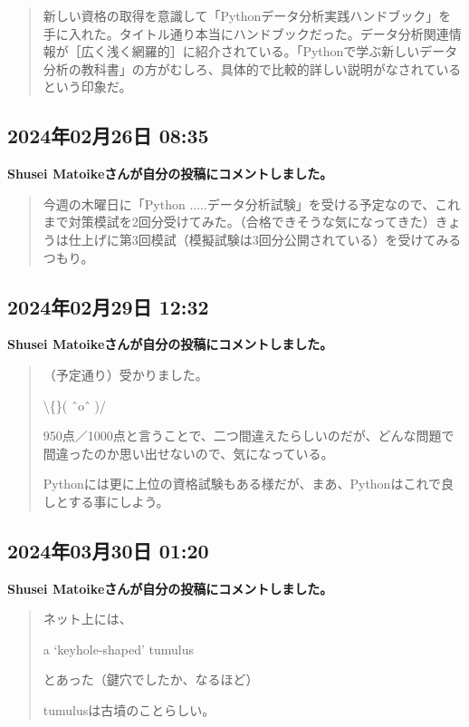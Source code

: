 \begin{quote}
新しい資格の取得を意識して「Pythonデータ分析実践ハンドブック」を手に入れた。タイトル通り本当にハンドブックだった。データ分析関連情報が［広く浅く網羅的］に紹介されている。「Pythonで学ぶ新しいデータ分析の教科書」の方がむしろ、具体的で比較的詳しい説明がなされているという印象だ。
\end{quote}

\subsection*{2024年02月26日 08:35}

\textbf{Shusei Matoikeさんが自分の投稿にコメントしました。}

\begin{quote}
今週の木曜日に「Python .....データ分析試験」を受ける予定なので、これまで対策模試を2回分受けてみた。（合格できそうな気になってきた）きょうは仕上げに第3回模試（模擬試験は3回分公開されている）を受けてみるつもり。
\end{quote}

\subsection*{2024年02月29日 12:32}

\textbf{Shusei Matoikeさんが自分の投稿にコメントしました。}

\begin{quote}
（予定通り）受かりました。

\textbackslash\{\}( ˆoˆ )/

950点／1000点と言うことで、二つ間違えたらしいのだが、どんな問題で間違ったのか思い出せないので、気になっている。

Pythonには更に上位の資格試験もある様だが、まあ、Pythonはこれで良しとする事にしよう。
\end{quote}

\subsection*{2024年03月30日 01:20}

\textbf{Shusei Matoikeさんが自分の投稿にコメントしました。}

\begin{quote}
ネット上には、

a ‘keyhole‐shaped' tumulus

とあった（鍵穴でしたか、なるほど）

tumulusは古墳のことらしい。
\end{quote}

